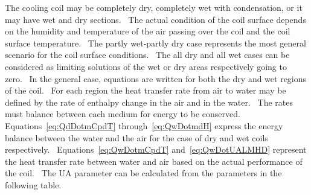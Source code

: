 The cooling coil may be completely dry, completely wet with condensation, or it may have wet and dry sections.~ The actual condition of the coil surface depends on the humidity and temperature of the air passing over the coil and the coil surface temperature.~ The partly wet-partly dry case represents the most general scenario for the coil surface conditions.~ The all dry and all wet cases can be considered as limiting solutions of the wet or dry areas respectively going to zero.~ In the general case, equations are written for both the dry and wet regions of the coil.~ For each region the heat transfer rate from air to water may be defined by the rate of enthalpy change in the air and in the water.~ The rates must balance between each medium for energy to be conserved.~ Equations~\ref{eq:QdDotmCpdT} through~\ref{eq:QwDotmdH} express the energy balance between the water and the air for the case of dry and wet coils respectively.~ Equations~\ref{eq:QwDotmCpdT} and~\ref{eq:QwDotUALMHD} represent the heat transfer rate between water and air based on the actual performance of the coil.~ The UA parameter can be calculated from the parameters in the following table.

